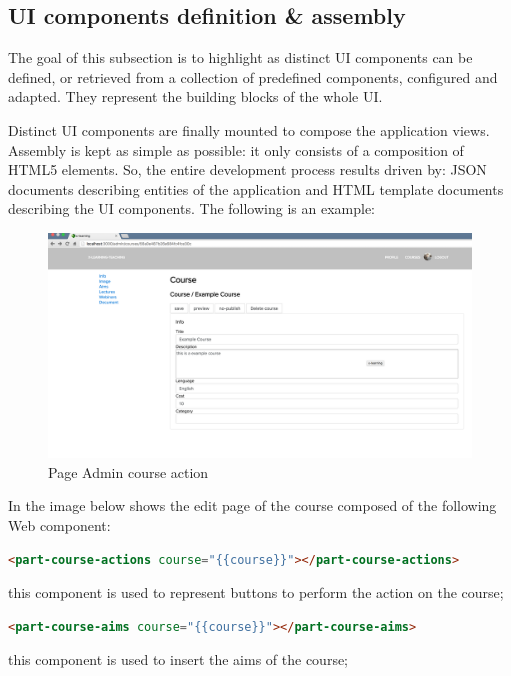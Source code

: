 \subsection {UI components definition \& assembly}
\label{subsec:components_definition}
The goal of this subsection is to highlight as distinct UI components can be defined, or retrieved from a collection of predefined components, configured and adapted. They represent the building blocks of the whole UI.

Distinct UI components are finally mounted to compose the application views. Assembly is kept as simple as possible: it only consists of a composition of HTML5 elements. So, the entire development process results driven by: JSON documents describing entities of the application and HTML template documents describing the UI components.
{\color{red} The following is an example: }

\begin{figure}[htb] %
 \centering
 \includegraphics[width=1.0\linewidth]{images/chapter4/page-course-admin.png}\hfill
 \caption[Page Admin course action]{Page Admin course action}
 \label{fig:fourV}
\end{figure}

In the image below shows the edit page of the course composed of the following Web component:

\begin{lstlisting}[language=html]
<part-course-actions course="{{course}}"></part-course-actions>
\end{lstlisting}
this component is used to represent buttons to perform the action on the course;

\begin{lstlisting}[language=html]
<part-course-aims course="{{course}}"></part-course-aims>
\end{lstlisting}
this component is used to insert the aims of the course;

